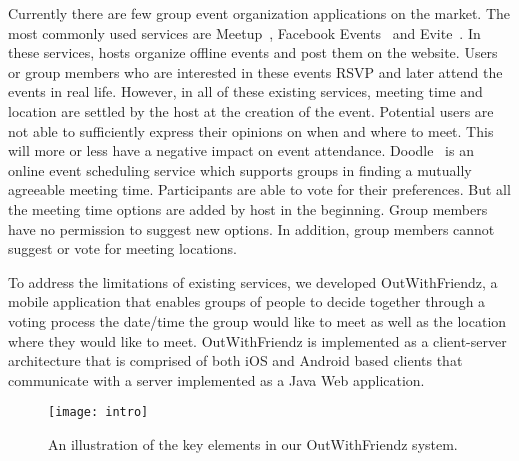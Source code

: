 Currently there are few group event organization applications on the market. 
The most commonly used services are Meetup~\cite{meetup-about}, 
Facebook Events~\cite{facebook} and Evite~\cite{evite}. 
In these services, hosts organize offline events and post them on the website.
Users or group members who are interested in these events RSVP and later
attend the events in real life. However, in all of these existing services, meeting 
time and location are settled by the host at the creation of the event. Potential
users are not able to sufficiently express their opinions on when and where to
meet. This will more or less have a negative impact on event attendance. 
Doodle~\cite{doodle} is an online event scheduling service which supports 
groups in finding a mutually agreeable meeting time. Participants are able to vote 
for their  preferences. But all the meeting time options are 
{added by host in the beginning}. Group members have no permission to suggest new options. In addition,
group members cannot suggest or vote for meeting locations. 

To address the limitations of existing services, we developed OutWithFriendz, a mobile
application that enables groups of people to decide together through a voting
process the date/time the group would like to meet as well as the location where 
they would like to meet. OutWithFriendz is implemented as a client-server 
architecture that is comprised of both iOS and Android based clients that 
communicate with a server implemented as a Java Web application.

\begin{figure}[t] 
\centering
\texttt{[image: intro]}
\caption{An illustration of the key elements in our OutWithFriendz system. }
\label{fig:intro}
\end{figure}

